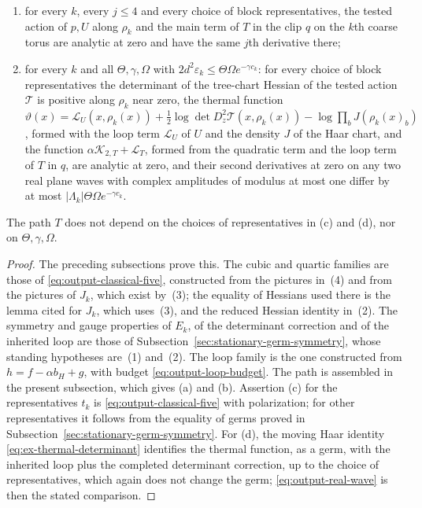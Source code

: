 \begin{proposition}
\begin{enumerate}
 $0<s'\leq s$,
 $A'\geq\max\{\mathcal B_{\rm row}(w,M_H),KX\}$ and
 $\Lambda'\geq D\bigl(\Phi+|\alpha|
   \operatorname{quadBound}(\min(\sigma,w),M_H)+R\bigr)$;
\item[(c)] for every $k$, every $j\leq4$ and every choice of block
 representatives, the tested action of $p,U$ along $\rho_k$ and the
 main term of $T$ in the clip $q$ on the $k$th coarse torus are
 analytic at zero and have the same $j$th derivative there;
\item[(d)] for every $k$ and all $\Theta,\gamma,\Omega$ with
 $2d^2\varepsilon_k\leq\Theta\Omega e^{-\gamma c_k}$: for every choice
 of block representatives the determinant of the tree-chart Hessian of
 the tested action $\mathcal T$ is positive along $\rho_k$ near zero,
 the thermal function
 $\vartheta(x)=\mathcal L_U(x,\rho_k(x))
   +\frac12\log\det D_z^2\mathcal T(x,\rho_k(x))
   -\log\prod_bJ(\rho_k(x)_b)$,
 formed with the loop term $\mathcal L_U$ of $U$ and the density $J$
 of the Haar chart, and the function
 $\alpha\mathcal K_{2,T}+\mathcal L_T$, formed from the quadratic term
 and the loop term of $T$ in $q$, are analytic at zero, and their
 second derivatives at zero on any two real plane waves with complex
 amplitudes of modulus at most one differ by at most
 $|\Lambda_k|\Theta\Omega e^{-\gamma c_k}$.
\end{enumerate}
The path $T$ does not depend on the choices of representatives in
\textup{(c)} and \textup{(d)}, nor on $\Theta,\gamma,\Omega$.
\end{proposition}
\begin{proof}
The preceding subsections prove this. The cubic and quartic families
are those of \eqref{eq:output-classical-five}, constructed from the
pictures in~(4) and from the pictures of $J_k$, which exist by~(3);
the equality of Hessians used there is the lemma cited for $J_k$,
which uses~(3), and the reduced Hessian identity in~(2). The symmetry
and gauge properties of $E_k$, of the determinant correction and of
the inherited loop are those of
Subsection~\ref{sec:stationary-germ-symmetry}, whose standing hypotheses
are~(1) and~(2). The loop family is the one constructed from
$h=f-\alpha b_H+g$, with budget \eqref{eq:output-loop-budget}. The
path is assembled in the present subsection, which gives (a) and (b).
Assertion (c) for the representatives $t_k$ is
\eqref{eq:output-classical-five} with polarization; for other
representatives it follows from the equality of germs proved in
Subsection~\ref{sec:stationary-germ-symmetry}. For (d), the moving Haar
identity \eqref{eq:ex-thermal-determinant} identifies the thermal
function, as a germ, with the inherited loop plus the completed
determinant correction, up to the choice of representatives, which
again does not change the germ; \eqref{eq:output-real-wave} is then
the stated comparison.
\end{proof}

